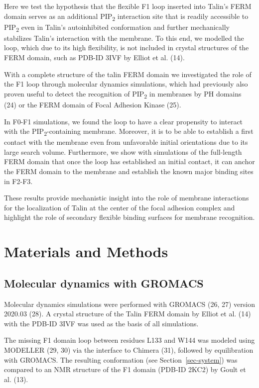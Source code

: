 \documentclass[
  twocolumn]{biophys-new-mod}
\begin{document}
Here we test the hypothesis that the flexible F1 loop inserted into
Talin's FERM domain serves as an additional PIP\textsubscript{2}
interaction site that is readily accessible to PIP\textsubscript{2} even
in Talin's autoinhibited conformation and further mechanically
stabilizes Talin's interaction with the membrane. To this end, we
modelled the loop, which due to its high flexibility, is not included in
crystal structures of the FERM domain, such as PDB-ID 3IVF by Elliot et
al. (14).

With a complete structure of the talin FERM domain we investigated the
role of the F1 loop through molecular dynamics simulations, which had
previously also proven useful to detect the recognition of
PIP\textsubscript{2} in membranes by PH domains (24) or the FERM domain
of Focal Adhesion Kinase (25).

In F0-F1 simulations, we found the loop to have a clear propensity to
interact with the PIP\textsubscript{2}-containing membrane. Moreover, it
is to be able to establish a first contact with the membrane even from
unfavorable initial orientations due to its large search volume.
Furthermore, we show with simulations of the full-length FERM domain
that once the loop has established an initial contact, it can anchor the
FERM domain to the membrane and establish the known major binding sites
in F2-F3.

These results provide mechanistic insight into the role of membrane
interactions for the localization of Talin at the center of the focal
adhesion complex and highlight the role of secondary flexible binding
surfaces for membrane recognition.

\hypertarget{materials-and-methods}{%
\section{Materials and Methods}\label{materials-and-methods}}

\hypertarget{molecular-dynamics-with-gromacs}{%
\subsection{Molecular dynamics with
GROMACS}\label{molecular-dynamics-with-gromacs}}

Molecular dynamics simulations were performed with GROMACS (26, 27)
version 2020.03 (28). A crystal structure of the Talin FERM domain by
Elliot et al. (14) with the PDB-ID 3IVF was used as the basis of all
simulations.

The missing F1 domain loop between residues L133 and W144 was modeled
using MODELLER (29, 30) via the interface to Chimera (31), followed by
equilibration with GROMACS. The resulting conformation (see
Section~\ref{sec-system}) was compared to an NMR structure of the F1
domain (PDB-ID 2KC2) by Goult et al. (13).
\end{document}
